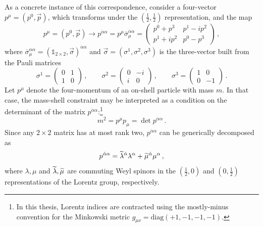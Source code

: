 As a concrete instance of this correspondence, consider a four-vector $p^\mu = (p^0,\vec p)$, which transforms under the $(\frac{1}{2},\frac{1}{2})$ representation, and the map
\begin{equation}\label{eq:pmatrix}
    p^\mu = (p^0,\vec p) \longrightarrow p^{\dot\alpha \alpha} = p^\mu  \overline \sigma_{\mu}^{\dot\alpha \alpha} = \begin{pmatrix}
        p^0+p^3 & p^1-ip^2 \\
        p^1+ip^2 & p^0-p^3
    \end{pmatrix}\,,
\end{equation}
where $\overline \sigma_\mu^{\dot\alpha \alpha} = (\mathbb 1_{2\times 2},\vec \sigma)^{\dot\alpha \alpha}$ and $\vec \sigma = (\sigma^1,\sigma^2,\sigma^3)$ is the three-vector built from the Pauli matrices
\begin{equation}
    \sigma^1 = \begin{pmatrix}
        0& 1 \\ 1 & 0
    \end{pmatrix}\,,\qquad
    \sigma^2 = \begin{pmatrix}
        0& -i \\ i & 0
    \end{pmatrix}\,,\qquad
    \sigma^3 = \begin{pmatrix}
        1& 0 \\ 0 & -1
    \end{pmatrix}\,.
\end{equation}
Let $p^\mu$ denote the four-momentum of an on-shell particle with mass $m$. In that case, the mass-shell constraint may be interpreted as a condition on the determinant of the matrix $p^{\dot\alpha\alpha}$:\footnote{In this thesis, Lorentz indices are contracted using the mostly-minus convention for the Minkowski metric $g_{\mu\nu} = \text{diag}(+1,-1,-1,-1)$.}
\begin{equation}
    m^2 = p^\mu p_\mu = \det p^{\dot\alpha\alpha}\,.
\end{equation}
Since any $2\times 2$ matrix has at most rank two, 
$p^{\dot\alpha\alpha}$ can be generically decomposed as
\begin{equation}\label{eq:generaldecomposition}
    p^{\dot\alpha\alpha}=\widetilde{\lambda}^{\dot\alpha}\lambda^{\alpha}+\widetilde{\mu}^{\dot\alpha}\mu^{\alpha}\,,
\end{equation}
where $\lambda,\mu$ and $\widetilde{\lambda},\widetilde{\mu}$ are commuting Weyl spinors in the $(\frac{1}{2},0)$ and $(0,\frac{1}{2})$ representations of the Lorentz group, respectively.

